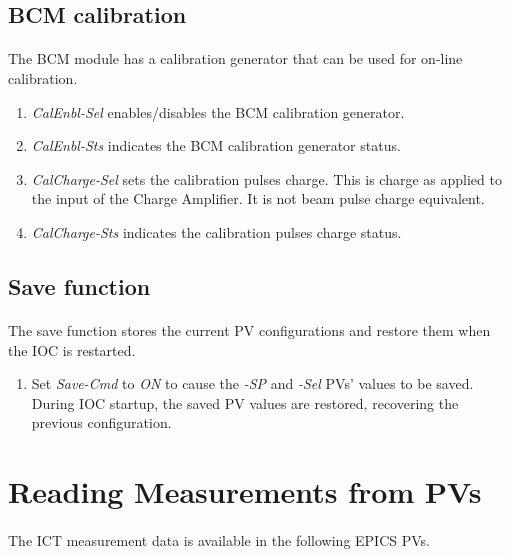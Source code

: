 \documentclass[openany]{article}
\begin{document}
	\subsection{BCM calibration}

		\paragraph{} The BCM module has a calibration generator that can be used for on-line calibration.

			\begin{enumerate}
				\item \emph{CalEnbl-Sel} enables/disables the BCM calibration generator.
				\item \emph{CalEnbl-Sts} indicates the BCM calibration generator status.
				\item \emph{CalCharge-Sel} sets the calibration pulses charge. This is charge as applied to the input of the Charge Amplifier. It is not beam pulse charge equivalent.
				\item \emph{CalCharge-Sts} indicates the calibration pulses charge status.
			\end{enumerate}

	\subsection{Save function}

		\paragraph{} The save function stores the current PV configurations and restore them when the IOC is restarted.

			\begin{enumerate}
				\item Set \emph{Save-Cmd} to \emph{ON} to cause the \emph{-SP} and \emph{-Sel} PVs' values to be saved. During IOC startup, the saved PV values are restored, recovering the previous configuration.
			\end{enumerate}

\section{Reading Measurements from PVs}

	\paragraph{} The ICT measurement data is available in the following EPICS PVs.
\end{document}
